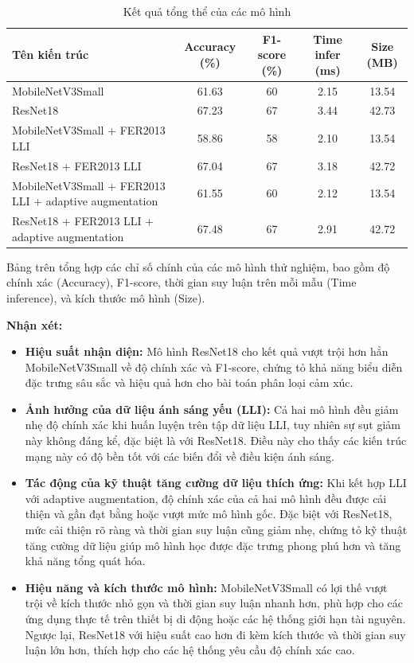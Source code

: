 \begin{table}[H]
\centering
\caption{Kết quả tổng thể của các mô hình}
\begin{tabular}{@{}>{\raggedright\arraybackslash}p{5cm}cccc@{}}
\toprule
\textbf{Tên kiến trúc} & \textbf{Accuracy (\%)} & \textbf{F1-score (\%)} & \textbf{Time infer (ms)} & \textbf{Size (MB)} \\ \midrule
MobileNetV3Small & 61.63 & 60 & 2.15 & 13.54 \\
ResNet18 & 67.23 & 67 & 3.44 & 42.73 \\
MobileNetV3Small + FER2013 LLI & 58.86 & 58 & 2.10 & 13.54 \\
ResNet18 + FER2013 LLI & 67.04 & 67 & 3.18 & 42.72 \\
MobileNetV3Small + FER2013 LLI + adaptive augmentation & 61.55 & 60 & 2.12 & 13.54 \\
ResNet18 + FER2013 LLI + adaptive augmentation & 67.48 & 67 & 2.91 & 42.72 \\ \bottomrule
\end{tabular}
\label{tab:overall-results}
\end{table}

Bảng trên tổng hợp các chỉ số chính của các mô hình thử nghiệm, bao gồm độ chính xác (Accuracy), F1-score, thời gian suy luận trên mỗi mẫu (Time inference), và kích thước mô hình (Size). 

\textbf{Nhận xét:}

\begin{itemize}
    \item \textbf{Hiệu suất nhận diện:} Mô hình ResNet18 cho kết quả vượt trội hơn hẳn MobileNetV3Small về độ chính xác và F1-score, chứng tỏ khả năng biểu diễn đặc trưng sâu sắc và hiệu quả hơn cho bài toán phân loại cảm xúc.
    
    \item \textbf{Ảnh hưởng của dữ liệu ánh sáng yếu (LLI):} Cả hai mô hình đều giảm nhẹ độ chính xác khi huấn luyện trên tập dữ liệu LLI, tuy nhiên sự sụt giảm này không đáng kể, đặc biệt là với ResNet18. Điều này cho thấy các kiến trúc mạng này có độ bền tốt với các biến đổi về điều kiện ánh sáng.
    
    \item \textbf{Tác động của kỹ thuật tăng cường dữ liệu thích ứng:} Khi kết hợp LLI với adaptive augmentation, độ chính xác của cả hai mô hình đều được cải thiện và gần đạt bằng hoặc vượt mức mô hình gốc. Đặc biệt với ResNet18, mức cải thiện rõ ràng và thời gian suy luận cũng giảm nhẹ, chứng tỏ kỹ thuật tăng cường dữ liệu giúp mô hình học được đặc trưng phong phú hơn và tăng khả năng tổng quát hóa.
    
    \item \textbf{Hiệu năng và kích thước mô hình:} MobileNetV3Small có lợi thế vượt trội về kích thước nhỏ gọn và thời gian suy luận nhanh hơn, phù hợp cho các ứng dụng thực tế trên thiết bị di động hoặc các hệ thống giới hạn tài nguyên. Ngược lại, ResNet18 với hiệu suất cao hơn đi kèm kích thước và thời gian suy luận lớn hơn, thích hợp cho các hệ thống yêu cầu độ chính xác cao.
\end{itemize}


